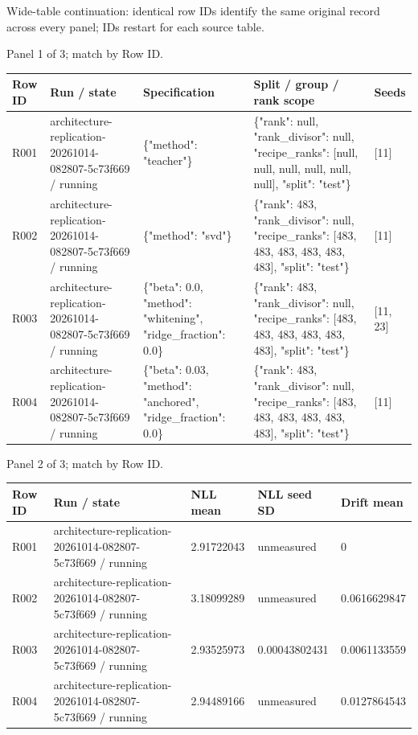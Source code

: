\documentclass[10pt]{article}
\begin{document}
Wide-table continuation: identical row IDs identify the same original record across every panel; IDs restart for each source table.
\par\noindent Panel 1 of 3; match by Row ID.
{\scriptsize\setlength{\tabcolsep}{2pt}
\begin{longtable}{p{}p{}p{}p{}p{}}
Row ID & Run / state & Specification & Split / group / rank scope & Seeds \\
\hline\endhead
R001 & architecture-replication-20261014-082807-5c73f669 / running & \{"method": "teacher"\} & \{"rank": null, "rank\_divisor": null, "recipe\_ranks": [null, null, null, null, null, null], "split": "test"\} & [11] \\
R002 & architecture-replication-20261014-082807-5c73f669 / running & \{"method": "svd"\} & \{"rank": 483, "rank\_divisor": null, "recipe\_ranks": [483, 483, 483, 483, 483, 483], "split": "test"\} & [11] \\
R003 & architecture-replication-20261014-082807-5c73f669 / running & \{"beta": 0.0, "method": "whitening", "ridge\_fraction": 0.0\} & \{"rank": 483, "rank\_divisor": null, "recipe\_ranks": [483, 483, 483, 483, 483, 483], "split": "test"\} & [11, 23] \\
R004 & architecture-replication-20261014-082807-5c73f669 / running & \{"beta": 0.03, "method": "anchored", "ridge\_fraction": 0.0\} & \{"rank": 483, "rank\_divisor": null, "recipe\_ranks": [483, 483, 483, 483, 483, 483], "split": "test"\} & [11] \\
\end{longtable}}
\par\noindent Panel 2 of 3; match by Row ID.
{\scriptsize\setlength{\tabcolsep}{2pt}
\begin{longtable}{p{}p{}p{}p{}p{}}
Row ID & Run / state & NLL mean & NLL seed SD & Drift mean \\
\hline\endhead
R001 & architecture-replication-20261014-082807-5c73f669 / running & 2.91722043 & unmeasured & 0 \\
R002 & architecture-replication-20261014-082807-5c73f669 / running & 3.18099289 & unmeasured & 0.0616629847 \\
R003 & architecture-replication-20261014-082807-5c73f669 / running & 2.93525973 & 0.00043802431 & 0.0061133559 \\
R004 & architecture-replication-20261014-082807-5c73f669 / running & 2.94489166 & unmeasured & 0.0127864543 \\
\end{longtable}}
\end{document}
